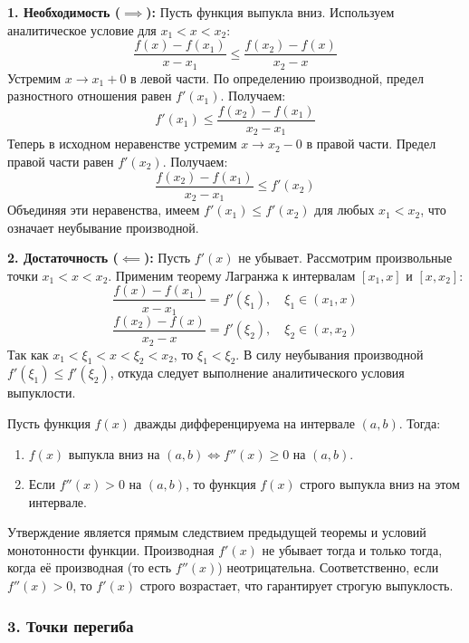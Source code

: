 \begin{tcolorbox}[title=Доказательство, breakable]
\textbf{1. Необходимость ($\implies$):}
Пусть функция выпукла вниз. Используем аналитическое условие для $x_1 < x < x_2$:
\[ \frac{f(x) - f(x_1)}{x - x_1} \le \frac{f(x_2) - f(x)}{x_2 - x} \]
Устремим $x \to x_1 + 0$ в левой части. По определению производной, предел разностного отношения равен $f'(x_1)$. Получаем:
\[ f'(x_1) \le \frac{f(x_2) - f(x_1)}{x_2 - x_1} \]
Теперь в исходном неравенстве устремим $x \to x_2 - 0$ в правой части. Предел правой части равен $f'(x_2)$. Получаем:
\[ \frac{f(x_2) - f(x_1)}{x_2 - x_1} \le f'(x_2) \]
Объединяя эти неравенства, имеем $f'(x_1) \le f'(x_2)$ для любых $x_1 < x_2$, что означает неубывание производной.

\textbf{2. Достаточность ($\impliedby$):}
Пусть $f'(x)$ не убывает. Рассмотрим произвольные точки $x_1 < x < x_2$. Применим теорему Лагранжа к интервалам $[x_1, x]$ и $[x, x_2]$:
\[ \frac{f(x) - f(x_1)}{x - x_1} = f'(\xi_1), \quad \xi_1 \in (x_1, x) \]
\[ \frac{f(x_2) - f(x)}{x_2 - x} = f'(\xi_2), \quad \xi_2 \in (x, x_2) \]
Так как $x_1 < \xi_1 < x < \xi_2 < x_2$, то $\xi_1 < \xi_2$. В силу неубывания производной $f'(\xi_1) \le f'(\xi_2)$, откуда следует выполнение аналитического условия выпуклости.
\end{tcolorbox}

\begin{theorem}
Пусть функция $f(x)$ дважды дифференцируема на интервале $(a, b)$. Тогда:
\begin{enumerate}
    \item $f(x)$ выпукла вниз на $(a, b) \iff f''(x) \ge 0$ на $(a, b)$.
    \item Если $f''(x) > 0$ на $(a, b)$, то функция $f(x)$ строго выпукла вниз на этом интервале.
\end{enumerate}
\end{theorem}

\begin{tcolorbox}[title=Доказательство, breakable]
Утверждение является прямым следствием предыдущей теоремы и условий монотонности функции. Производная $f'(x)$ не убывает тогда и только тогда, когда её производная (то есть $f''(x)$) неотрицательна. Соответственно, если $f''(x) > 0$, то $f'(x)$ строго возрастает, что гарантирует строгую выпуклость.
\end{tcolorbox}

\subsubsection*{3. Точки перегиба}

